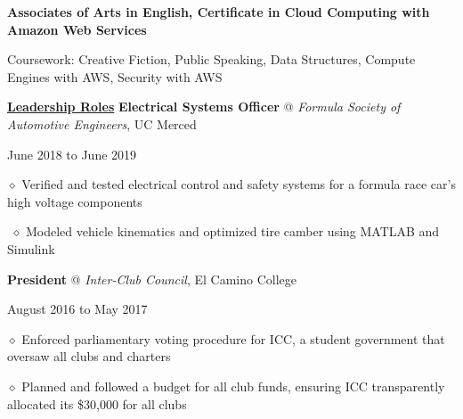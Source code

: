 \documentclass [11pt]{article}
\begin{document}
\begin{flushleft}
\textbf{Associates of Arts in English, Certificate in Cloud Computing with Amazon Web Services}

\raggedright
\quad\quad\quad Coursework: Creative Fiction, Public Speaking, Data Structures, Compute Engines with AWS, Security with AWS
\normalsize

\linebreak
\raggedright

\vspace{7}
\underline{\textbf{Leadership Roles}}
\linebreak
\textbf{Electrical Systems Officer} @ \emph{Formula Society of Automotive Engineers}, UC Merced \begin{minipage}{0.300 \linewidth}\begin{flushright}June 2018 to June 2019\end{flushright}\end{minipage}

‭‭\quad\quad\quad$\diamond$ Verified and tested electrical control and safety systems for a formula race car’s high voltage components

‭‭%
\quad\quad\quad$\diamond$ Modeled vehicle kinematics and optimized tire camber using MATLAB and Simulink

\linebreak
\textbf{President} @ \emph{Inter-Club Council}, El Camino College \begin{minipage}{0.565 \linewidth}\begin{flushright}August 2016 to May 2017\end{flushright}\end{minipage}

‭‭\quad\quad\quad$\diamond$ Enforced parliamentary voting procedure for ICC, a student government that oversaw all clubs and charters

‭‭\quad\quad\quad$\diamond$ Planned and followed a budget for all club funds, ensuring ICC transparently allocated its \$30,000 for all clubs

\linebreak


\end{flushleft}
\end{document}
